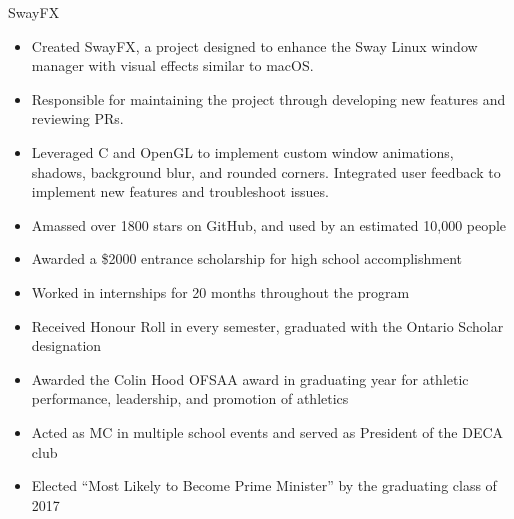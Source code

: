 
\bigskip


\bigskip


{\large\color{emphasis}SwayFX}
\smallskip\normalsize

\begin{itemize}
    \item Created SwayFX, a project designed to enhance the Sway Linux window manager with visual effects similar to macOS.
    \item Responsible for maintaining the project through developing new features and reviewing PRs.
    \item Leveraged C and OpenGL to implement custom window animations, shadows, background blur, and rounded corners. Integrated user feedback to implement new features and troubleshoot issues.
    \item Amassed over 1800 stars on GitHub, and used by an estimated 10,000 people
\end{itemize}

\begin{itemize}
    \item Awarded a \$2000 entrance scholarship for high school accomplishment
    \item Worked in internships for 20 months throughout the program
\end{itemize}

\divider

\begin{itemize}
    \item Received Honour Roll in every semester, graduated with the Ontario Scholar designation
    \item Awarded the Colin Hood OFSAA award in graduating year for athletic performance, leadership, and promotion of athletics
    \item Acted as MC in multiple school events and served as President of the DECA club
    \item Elected “Most Likely to Become Prime Minister” by the graduating class of 2017
\end{itemize}

